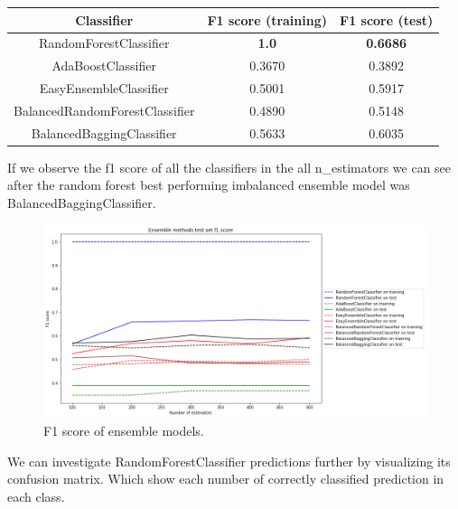 \documentclass[12pt]{article}
\begin{document}
\begin{center}
    \begin{tabular}{||c c c||} 
    \hline
    Classifier & F1 score (training) & F1 score (test)\\ [0.5ex] 
    \hline\hline
    RandomForestClassifier & \textbf{1.0} & \textbf{0.6686} \\ 
    \hline
    AdaBoostClassifier & 0.3670 & 0.3892 \\
    \hline
    EasyEnsembleClassifier & 0.5001 & 0.5917 \\
    \hline
    BalancedRandomForestClassifier & 0.4890 & 0.5148 \\
    \hline
    BalancedBaggingClassifier & 0.5633 & 0.6035\\ [1ex] 
    \hline
   \end{tabular}
\end{center}

If we observe the f1 score of all the classifiers in the all n\_estimators we can see after the random forest best performing imbalanced ensemble model was BalancedBaggingClassifier.

\begin{figure}[H] \label{fig:ensemblepf}
    \centering
    \includegraphics[width=\textwidth]{img/ensembletestf1.png}
    \caption{F1 score of ensemble models.}
\end{figure}

We can investigate RandomForestClassifier predictions further by visualizing its confusion matrix. Which show each number of correctly classified prediction in each class.
\end{document}
